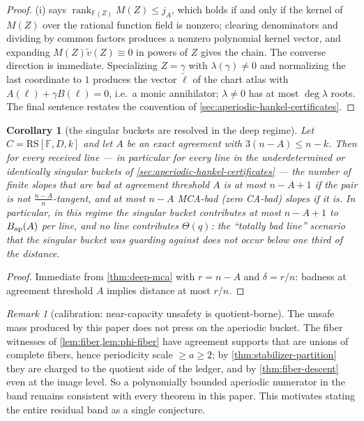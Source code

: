 \documentclass[11pt]{article}
\newtheorem{corollary}[corollary]{Corollary}
\theoremstyle{definition}
\theoremstyle{remark}
\newtheorem{remark}[remark]{Remark}
\newcommand{\F}{\mathbb{F}}
\newcommand{\RS}{\mathrm{RS}}
\begin{document}
\begin{proof}
(i) says $\operatorname{rank}_{\F(Z)}M(Z)\le j_A$, which holds if and only if the kernel of $M(Z)$ over the rational function field is nonzero; clearing denominators and dividing by common factors produces a nonzero polynomial kernel vector, and expanding $M(Z)\widetilde v(Z)\equiv0$ in powers of $Z$ gives the chain. The converse direction is immediate. Specializing $Z=\gamma$ with $\lambda(\gamma)\ne0$ and normalizing the last coordinate to $1$ produces the vector $\widetilde\ell$ of the chart atlas with $A(\ell)+\gamma B(\ell)=0$, i.e.\ a monic annihilator; $\lambda\ne0$ has at most $\deg\lambda$ roots. The final sentence restates the convention of \cref{sec:aperiodic-hankel-certificates}.
\end{proof}

\begin{corollary}[the singular buckets are resolved in the deep regime]\label{cor:singular-deep}
Let $C=\RS[\F,D,k]$ and let $A$ be an exact agreement with $3(n-A)\le n-k$. Then for every received line --- in particular for every line in the underdetermined or identically singular buckets of \cref{sec:aperiodic-hankel-certificates} --- the number of finite slopes that are bad at agreement threshold $A$ is at most $n-A+1$ if the pair is not $\frac{n-A}n$-tangent, and at most $n-A$ MCA-bad \textup(zero CA-bad\textup) slopes if it is. In particular, in this regime the singular bucket contributes at most $n-A+1$ to $B_{\rm ap}(A)$ per line, and no line contributes $\Theta(q)$: the ``totally bad line'' scenario that the singular bucket was guarding against does not occur below one third of the distance.
\end{corollary}

\begin{proof}
Immediate from \cref{thm:deep-mca} with $r=n-A$ and $\delta=r/n$: badness at agreement threshold $A$ implies distance at most $r/n$.
\end{proof}

\begin{remark}[calibration: near-capacity unsafety is quotient-borne]\label{rem:quotient-borne}
The unsafe mass produced by this paper does not press on the aperiodic bucket. The fiber witnesses of \cref{lem:fiber,lem:phi-fiber} have agreement supports that are unions of complete fibers, hence periodicity scale $\ge a\ge2$; by \cref{thm:stabilizer-partition} they are charged to the quotient side of the ledger, and by \cref{thm:fiber-descent} even at the image level. So a polynomially bounded aperiodic numerator in the band remains consistent with every theorem in this paper. This motivates stating the entire residual band as a single conjecture.
\end{remark}
\end{document}
